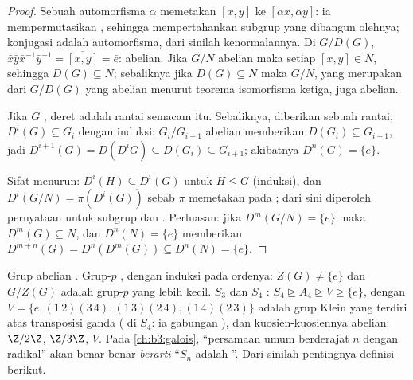 \begin{proof}
Sebuah automorfisma $\alpha$ memetakan $[x,y]$ ke $[\alpha x, \alpha y]$: ia
mempermutasikan , sehingga mempertahankan subgrup yang dibangun olehnya;
konjugasi adalah automorfisma, dari sinilah kenormalannya. Di $G/D(G)$,
$\bar x\bar y \bar x^{-1}\bar y^{-1} = \overline{[x,y]} = \bar e$:
 abelian. Jika $G/N$ abelian maka setiap $[x,y] \in
N$, sehingga $D(G) \subseteq N$; sebaliknya jika $D(G) \subseteq N$ maka
$G/N$, yang merupakan  dari $G/D(G)$ yang abelian menurut teorema
isomorfisma ketiga, juga abelian.

Jika $G$ , deret  adalah rantai semacam itu. Sebaliknya,
diberikan sebuah rantai, $D^i(G) \subseteq G_i$ dengan induksi: $G_i/G_{i+1}$
abelian memberikan $D(G_i) \subseteq G_{i+1}$, jadi $D^{i+1}(G) = D(D^i G)
\subseteq D(G_i) \subseteq G_{i+1}$; akibatnya $D^n(G) = \{e\}$.

Sifat menurun: $D^i(H) \subseteq D^i(G)$ untuk $H \leq G$ (induksi),
dan $D^i(G/N) = \pi(D^i(G))$ sebab $\pi$ memetakan  pada
; dari sini diperoleh pernyataan untuk subgrup dan .
Perluasan: jika $D^m(G/N) = \{e\}$ maka $D^m(G) \subseteq N$, dan
$D^n(N) = \{e\}$ memberikan $D^{m+n}(G) = D^n(D^m(G)) \subseteq D^n(N)
= \{e\}$.
\end{proof}

\begin{example}\label{ex:b3:groups:solvableexamples}
Grup abelian . Grup-$p$ , dengan induksi
pada ordenya: $Z(G) \neq \{e\}$ dan $G/Z(G)$ adalah grup-$p$ yang
lebih kecil. $S_3$ dan $S_4$ : $S_4 \trianglerighteq A_4
\trianglerighteq V \trianglerighteq \{e\}$, dengan $V = \{e,
(1\,2)(3\,4), (1\,3)(2\,4), (1\,4)(2\,3)\}$ adalah grup Klein yang terdiri atas
transposisi ganda ( di $S_4$: ia gabungan ), dan kuosien-kuosiennya abelian: $\Z/2\Z$, $\Z/3\Z$, $V$. Pada
\cref{ch:b3:galois}, ``persamaan umum berderajat $n$
 dengan radikal'' akan benar-benar \emph{berarti} ``$S_n$ adalah
''. Dari sinilah pentingnya definisi berikut.
\end{example}

